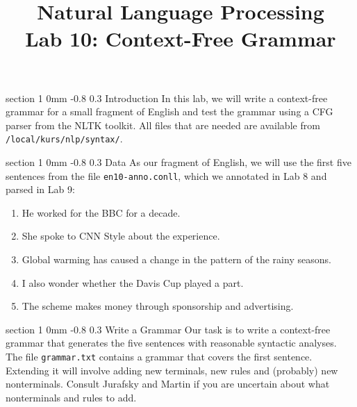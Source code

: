 \documentclass[10.9pt]{article}
\title{{\LARGE Natural Language Processing}\\[1.5mm]{\large Lab 10: Context-Free Grammar}}
\author{}
\date{} %
\makeatletter
\newcommand{\newsec}[2]{\section{#1}\label{sec:#2}\noindent}
\renewcommand{\section}{\@startsection
{section}%
{1}%
{0mm}%
{-0.8\baselineskip}%
{0.3\baselineskip}%
{\bfseries\large}}%
\makeatother
\begin{document}
 

\maketitle
\vspace{-2mm}
\newsec{Introduction}{intro}%
In this lab, we will write a context-free grammar for a small fragment of English and test the grammar using a CFG parser from the NLTK toolkit. All files that are needed are available from {\tt /local/kurs/nlp/syntax/}.

\newsec{Data}{data}%
As our fragment of English, we will use the first five sentences from the file {\tt en10-anno.conll}, which we annotated in Lab 8 and parsed in Lab 9:
\begin{enumerate}[noitemsep]
\item He worked for the BBC for a decade.
\item She spoke to CNN Style about the experience.
\item Global warming has caused a change in the pattern of the rainy seasons.
\item I also wonder whether the Davis Cup played a part.
\item The scheme makes money through sponsorship and advertising.
\end{enumerate}

\newsec{Write a Grammar}{grammar}%
Our task is to write a context-free grammar that generates the five sentences with reasonable syntactic analyses. The file {\tt grammar.txt} contains a grammar that covers the first sentence. Extending it will involve adding new terminals, new rules and (probably) new nonterminals. Consult Jurafsky and Martin if you are uncertain about what nonterminals and rules to add.
\end{document}
